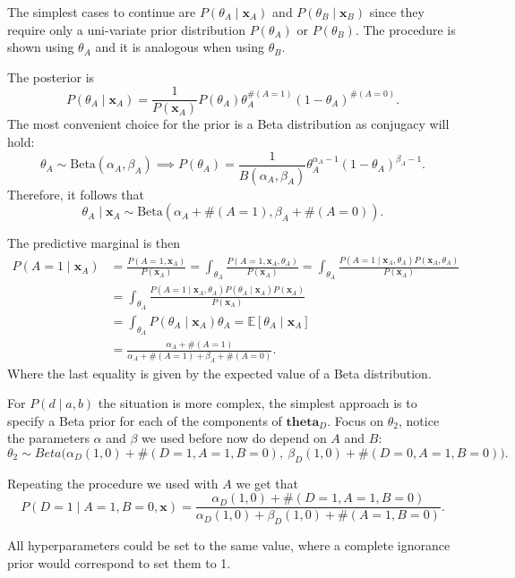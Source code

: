 \documentclass[11pt]{article}
\theoremstyle{definition}
\begin{document}
The simplest cases to continue are \(P(\theta_{A} \mid \bm{x}_{A})\) and
\(P(\theta_{B} \mid \bm{x}_{B})\) since they require only a uni-variate prior distribution
\(P(\theta_{A})\) or \(P(\theta_{B})\). The procedure is shown using \( \theta_A \) and it is analogous when using \( \theta_B \). 

The posterior is
\[
  P(\theta_{A} \mid \bm{x}_{A}) = \frac{1}{P(\bm{x}_{A})}P(\theta_{A})\theta_{A}^{\#(A=1)}{(1-\theta_{A})}^{\#(A=0)}.
\]
The most convenient choice for the prior is a Beta distribution as conjugacy
will hold:
\[
  \theta_{A} \sim \text{Beta}(\alpha_{A}, \beta_{A}) \implies P(\theta_{A})  = \frac{1}{B(\alpha_{A}, \beta_{A})}\theta_{A}^{\alpha_{A}-1}(1-\theta_{A})^{\beta_{A} - 1}.
\]
Therefore, it follows that
\[
  \theta_{A} \mid \bm{x}_{A} \sim \text{Beta}(\alpha_{A} + \#(A=1), \beta_{A} + \#(A = 0)).
\]

The predictive marginal is then
\[
  \begin{aligned}
    P(A = 1 \mid \bm{x}_{A})
    &= \frac{P(A = 1, \bm{x}_{A})}{P(\bm{x}_{A})} = \int_{\theta_{A}}  \frac{P(A = 1, \bm{x}_{A}, \theta_{A})}{P(\bm{x}_{A})} =  \int_{\theta_{A}}  \frac{P(A = 1 \mid \bm{x}_{A}, \theta_{A}) P(\bm{x}_{A}, \theta_{A})}{P(\bm{x}_{A})} \\
    &=  \int_{\theta_{A}}  \frac{P(A = 1 \mid \bm{x}_{A}, \theta_{A}) P(\theta_{A} \mid \bm{x}_{A})P(\bm{x}_{A})}{P(\bm{x}_{A})} \\
    &= \int_{\theta_{A}}P(\theta_{A}\mid \bm{x}_{A})\theta_{A} = \mathbb{E}[\theta_{A} \mid \bm{x}_{A}] \\
    &= \frac{\alpha_{A} + \#(A= 1)}{\alpha_{A} + \#(A=1) + \beta_{A} + \#(A=0)}.
  \end{aligned}
\]
Where the last equality is given by the expected value of a Beta distribution.

For \(P(d \mid a ,b)\) the situation is more complex, the simplest approach
is to specify a Beta prior for each of the components of \(\bm{theta}_{D}\).
Focus on \(\theta_{2}\), notice the parameters \(\alpha\)
and \(\beta\) we used before now do depend on \(A\) and \(B\):
\[
  \theta_{2} \sim Beta\Big(\alpha_{D}(1,0) + \#(D = 1, A = 1, B = 0), \ \beta_{D}(1,0) + \#(D = 0, A = 1, B = 0)\Big).
\]

Repeating the procedure we used with \(A\) we get that
\[
  P(D = 1 \mid A = 1, B = 0, \bm{x}) = \frac{\alpha_{D}(1,0) + \#(D = 1, A = 1, B = 0)}{\alpha_{D}(1,0) + \beta_{D}(1,0) + \#(A=1, B = 0)}.
\]

All hyperparameters could be set to the same
value, where a complete ignorance prior would correspond to set them to 1.
\end{document}
